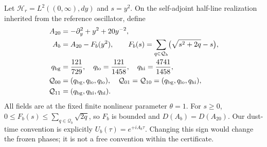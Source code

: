\documentclass[11pt]{article}
\begin{document}
Let $\mathcal H_r=L^2((0,\infty),dy)$ and $s=y^2$.
On the self-adjoint half-line realization inherited from the reference oscillator, define
\begin{align}
 A_{20}&=-\partial_y^2+y^2+20y^{-2},\label{eq:osc}\\
 A_b&=A_{20}-F_b(y^2),\qquad
 F_b(s)=\sum_{q\in\mathcal Q_b}\bigl(\sqrt{s^2+2q}-s\bigr),\label{eq:model}\\
 q_{\rm bg}&=\frac{121}{729},\quad q_{\rm lo}=\frac{121}{1458},\quad q_{\rm hi}=\frac{4741}{1458},\nonumber\\
 \mathcal Q_{00}&=(q_{\rm bg},q_{\rm lo},q_{\rm lo}),\quad
 \mathcal Q_{01}=\mathcal Q_{10}=(q_{\rm bg},q_{\rm lo},q_{\rm hi}),\nonumber\\
 \mathcal Q_{11}&=(q_{\rm bg},q_{\rm hi},q_{\rm hi}).\nonumber
\end{align}
All fields are at the fixed finite nonlinear parameter $\theta=1$.
For $s\geq0$, $0\leq F_b(s)\leq\sum_{q\in\mathcal Q_b}\sqrt{2q}$, so $F_b$ is bounded and $D(A_b)=D(A_{20})$.
Our dust-time convention is explicitly $U_b(\tau)=e^{+iA_b\tau}$.
Changing this sign would change the frozen phases; it is not a free convention within the certificate.
\end{document}
